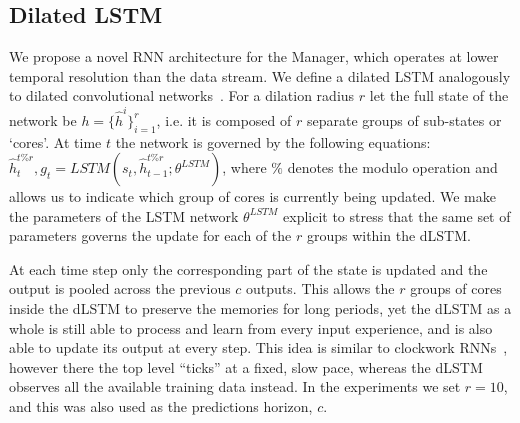 \subseckiny
\subsection{Dilated LSTM}
\subseckiny
\label{subsec:dLSTM}
We propose a novel RNN architecture for the Manager, which operates at lower temporal resolution than the data stream. We define a dilated LSTM analogously to dilated convolutional networks~\cite{yu2015dilated}. For a dilation radius $r$ let the full state of the network be $h = \{\hat{h}^i\}_{i=1}^r$, i.e. it is composed of $r$ separate groups of sub-states or `cores'. At time $t$ the network is governed by the following equations:
$\hat{h}^{t\%r}_t,g_t = \textit{LSTM}(s_t, \hat{h}^{t\%r}_{t-1}; \theta^{\textit{LSTM}})$,
where $\%$ denotes the modulo operation and allows us to indicate which group of cores is currently being updated. 
We make the parameters of the LSTM network $\theta^{\textit{LSTM}}$ explicit to stress that the same set of parameters governs the update for each of the $r$ groups within the dLSTM. 

At each time step only the corresponding part of the state is updated and the output is pooled across the previous $c$ outputs. This allows the $r$ groups of cores inside the dLSTM to preserve the memories for long periods, yet the dLSTM as a whole is still able to process and learn from every input experience, and is also able to update its output at every step. 
This idea is similar to clockwork RNNs~\cite{koutnik2014clockwork}, however there the top level ``ticks'' at a fixed, slow pace, whereas the dLSTM observes all the available training data instead. In the experiments we set $r=10$, and this was also used as the predictions horizon, $c$.